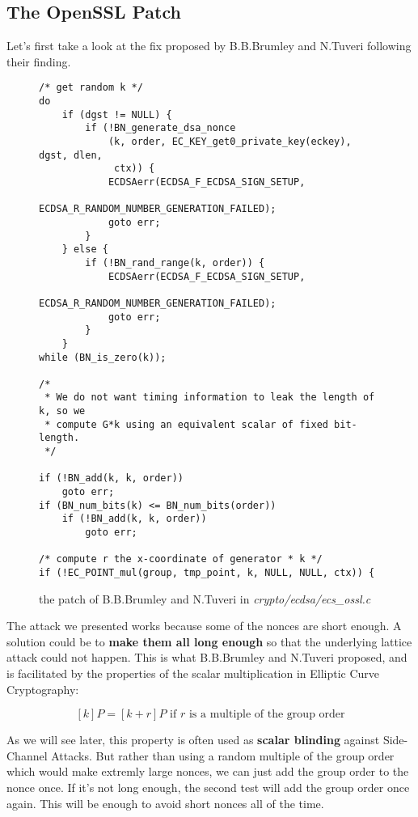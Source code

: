 \documentclass[a4paper,11pt]{article}
\begin{document}
\subsection{The OpenSSL Patch}

Let's first take a look at the fix proposed by B.B.Brumley and N.Tuveri following their finding.

\begin{figure}[H]
\begin{verbatim}
/* get random k */
do
    if (dgst != NULL) {
        if (!BN_generate_dsa_nonce
            (k, order, EC_KEY_get0_private_key(eckey), dgst, dlen,
             ctx)) {
            ECDSAerr(ECDSA_F_ECDSA_SIGN_SETUP,
                     ECDSA_R_RANDOM_NUMBER_GENERATION_FAILED);
            goto err;
        }
    } else {
        if (!BN_rand_range(k, order)) {
            ECDSAerr(ECDSA_F_ECDSA_SIGN_SETUP,
                     ECDSA_R_RANDOM_NUMBER_GENERATION_FAILED);
            goto err;
        }
    }
while (BN_is_zero(k));

/*
 * We do not want timing information to leak the length of k, so we
 * compute G*k using an equivalent scalar of fixed bit-length.
 */

if (!BN_add(k, k, order))
    goto err;
if (BN_num_bits(k) <= BN_num_bits(order))
    if (!BN_add(k, k, order))
        goto err;

/* compute r the x-coordinate of generator * k */
if (!EC_POINT_mul(group, tmp_point, k, NULL, NULL, ctx)) {
\end{verbatim}
\caption{the patch of B.B.Brumley and N.Tuveri in \textit{crypto/ecdsa/ecs\_ossl.c}}
\end{figure}

The attack we presented works because some of the nonces are short enough. A solution could be to \textbf{make them all long enough} so that the underlying lattice attack could not happen. This is what B.B.Brumley and N.Tuveri proposed, and is facilitated by the properties of the scalar multiplication in Elliptic Curve Cryptography:

$$ [k]P = [k + r]P \text{ if } r \text{ is a multiple of the group order} $$

As we will see later, this property is often used as \textbf{scalar blinding} against Side-Channel Attacks. But rather than using a random multiple of the group order which would make extremly large nonces, we can just add the group order to the nonce once. If it's not long enough, the second test will add the group order once again. This will be enough to avoid short nonces all of the time.
\end{document}
